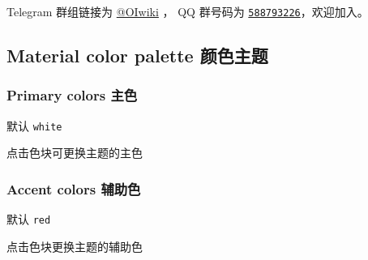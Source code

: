 Telegram 群组链接为 \href{https://t.me/OIwiki}{@OIwiki} ， QQ 群号码为 \href{https://jq.qq.com/?_wv=1027&k=5EfkM6K}{\texttt{588793226}}，欢迎加入。

\subsection{Material color palette 颜色主题}

\subsubsection{Primary colors 主色}

\begin{QUOTE}{}{}
默认 \texttt{white}
\end{QUOTE}

点击色块可更换主题的主色





\subsubsection{Accent colors 辅助色}

\begin{QUOTE}{}{}
默认 \texttt{red}
\end{QUOTE}

点击色块更换主题的辅助色




